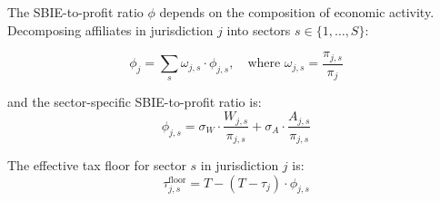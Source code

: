 \documentclass[11pt,a4paper]{article}
\begin{document}
The SBIE-to-profit ratio $\phi$ depends on the composition of economic activity. Decomposing affiliates in jurisdiction $j$ into sectors $s \in \{1, \ldots, S\}$:

\begin{equation}\label{eq:rho_sectoral}
\phi_j = \sum_s \omega_{j,s} \cdot \phi_{j,s}, \quad \text{where } \omega_{j,s} = \frac{\pi_{j,s}}{\pi_j}
\end{equation}

and the sector-specific SBIE-to-profit ratio is:
\begin{equation}\label{eq:rho_sector}
\phi_{j,s} = \sigma_W \cdot \frac{W_{j,s}}{\pi_{j,s}} + \sigma_A \cdot \frac{A_{j,s}}{\pi_{j,s}}
\end{equation}

The effective tax floor for sector $s$ in jurisdiction $j$ is:
\begin{equation}\label{eq:floor_sector}
\tau_{j,s}^{\text{floor}} = T - (T - \tau_j) \cdot \phi_{j,s}
\end{equation}
\end{document}
